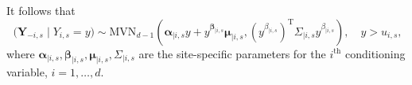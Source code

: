 \documentclass[12pt]{article}
\DeclareMathOperator{\CE}{\mathrm{CE}}
\newcommand{\mvmean}[1]{\symbf{\alpha}_{\mid i, #1} y + y^{\symbf{\beta}_{\mid i, #1}} \symbf{\mu}_{\mid i, #1}}
\newcommand{\mvcov}[1]{\left(y^{\beta_{\mid i, #1}}\right)^{\mathrm{T}} \Sigma_{\mid i, #1} y^{\beta_{\mid i, #1}}}
\begin{document}
It follows that 
\begin{equation}~\label{eq:ce_norm}
  \bigl(\symbf{Y}_{-i, s} \mid Y_{i, s} = y\bigr) \sim \mbox{MVN}_{d-1}\left(\mvmean{s}, \mvcov{s}\right),\quad y > u_{i, s},
\end{equation}
where $\symbf{\alpha}_{\mid i, s}, \symbf{\beta}_{\mid i, s}, \symbf{\mu}_{\mid i, s}, \Sigma_{\mid i, s}$ are the site-specific parameters for the $i^{\text{th}}$ conditioning variable, $i = 1, \ldots, d$. %
\end{document}
